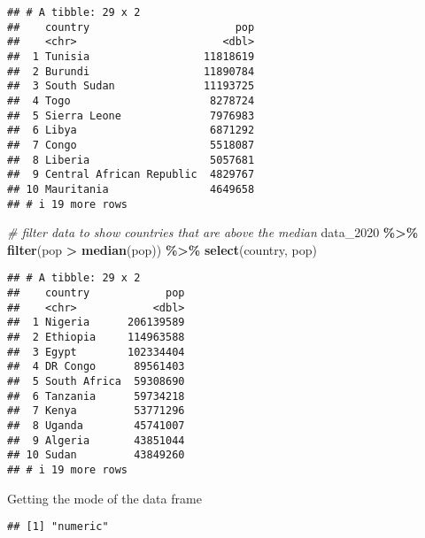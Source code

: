 \documentclass[
]{article}
\newenvironment{Shaded}{\begin{snugshade}}{\end{snugshade}}
\newcommand{\CommentTok}[1]{\textcolor[rgb]{0.56,0.35,0.01}{\textit{#1}}}
\newcommand{\FunctionTok}[1]{\textcolor[rgb]{0.13,0.29,0.53}{\textbf{#1}}}
\newcommand{\NormalTok}[1]{#1}
\newcommand{\SpecialCharTok}[1]{\textcolor[rgb]{0.81,0.36,0.00}{\textbf{#1}}}
\begin{document}
\begin{verbatim}
## # A tibble: 29 x 2
##    country                       pop
##    <chr>                       <dbl>
##  1 Tunisia                  11818619
##  2 Burundi                  11890784
##  3 South Sudan              11193725
##  4 Togo                      8278724
##  5 Sierra Leone              7976983
##  6 Libya                     6871292
##  7 Congo                     5518087
##  8 Liberia                   5057681
##  9 Central African Republic  4829767
## 10 Mauritania                4649658
## # i 19 more rows
\end{verbatim}

\begin{Shaded}
\begin{Highlighting}[]
\CommentTok{\# filter data to show countries that are above the median}
\NormalTok{data\_2020 }\SpecialCharTok{\%\textgreater{}\%} 
  \FunctionTok{filter}\NormalTok{(pop }\SpecialCharTok{\textgreater{}} \FunctionTok{median}\NormalTok{(pop)) }\SpecialCharTok{\%\textgreater{}\%} 
  \FunctionTok{select}\NormalTok{(country, pop)}
\end{Highlighting}
\end{Shaded}

\begin{verbatim}
## # A tibble: 29 x 2
##    country            pop
##    <chr>            <dbl>
##  1 Nigeria      206139589
##  2 Ethiopia     114963588
##  3 Egypt        102334404
##  4 DR Congo      89561403
##  5 South Africa  59308690
##  6 Tanzania      59734218
##  7 Kenya         53771296
##  8 Uganda        45741007
##  9 Algeria       43851044
## 10 Sudan         43849260
## # i 19 more rows
\end{verbatim}

Getting the mode of the data frame

\begin{Shaded}
\end{Shaded}

\begin{verbatim}
## [1] "numeric"
\end{verbatim}

\begin{Shaded}
\end{Shaded}
\end{document}
